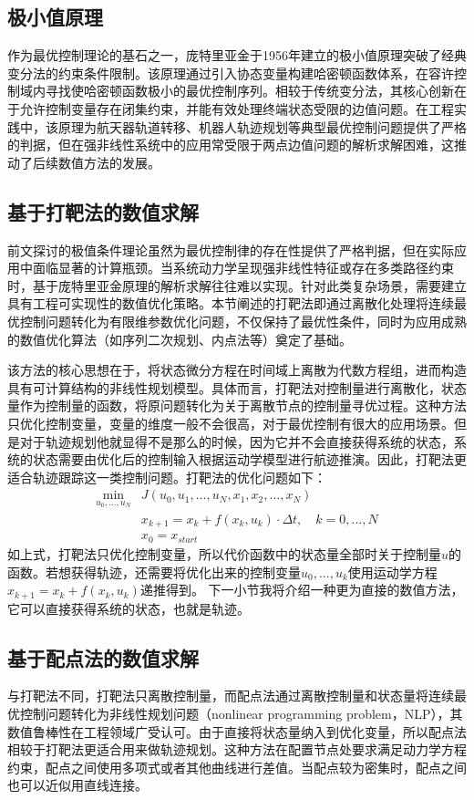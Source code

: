 \documentclass[master,academic]{ysuthesis} %
\begin{document}
	\subsection{极小值原理}
	作为最优控制理论的基石之一，庞特里亚金于1956年建立的极小值原理突破了经典变分法的约束条件限制。该原理通过引入协态变量构建哈密顿函数体系，在容许控制域内寻找使哈密顿函数极小的最优控制序列。相较于传统变分法，其核心创新在于允许控制变量存在闭集约束，并能有效处理终端状态受限的边值问题。在工程实践中，该原理为航天器轨道转移、机器人轨迹规划等典型最优控制问题提供了严格的判据，但在强非线性系统中的应用常受限于两点边值问题的解析求解困难，这推动了后续数值方法的发展。
	
	\subsection{基于打靶法的数值求解}
	前文探讨的极值条件理论虽然为最优控制律的存在性提供了严格判据，但在实际应用中面临显著的计算瓶颈。当系统动力学呈现强非线性特征或存在多类路径约束时，基于庞特里亚金原理的解析求解往往难以实现。针对此类复杂场景，需要建立具有工程可实现性的数值优化策略。本节阐述的打靶法即通过离散化处理将连续最优控制问题转化为有限维参数优化问题，不仅保持了最优性条件，同时为应用成熟的数值优化算法（如序列二次规划、内点法等）奠定了基础。

	该方法的核心思想在于，将状态微分方程在时间域上离散为代数方程组，进而构造具有可计算结构的非线性规划模型。具体而言，打靶法对控制量进行离散化，状态量作为控制量的函数，将原问题转化为关于离散节点的控制量寻优过程。这种方法只优化控制变量，变量的维度一般不会很高，对于最优控制有很大的应用场景。但是对于轨迹规划他就显得不是那么的时候，因为它并不会直接获得系统的状态，系统的状态需要由优化后的控制输入根据运动学模型进行航迹推演。因此，打靶法更适合轨迹跟踪这一类控制问题。打靶法的优化问题如下：
	\begin{equation}
	\begin{aligned}
		\min_{u_0,...,u_N} & J(u_0,u_1,\ldots,u_N,x_1,x_2,\ldots,x_N) \\
		& x_{k+1}=x_k+f(x_k,u_k)\cdot \Delta t,\quad k=0,\ldots,N \\
		& x_{0}=x_{start}
	\end{aligned}
	\end{equation}
	如上式，打靶法只优化控制变量，所以代价函数中的状态量全部时关于控制量$u$的函数。若想获得轨迹，还需要将优化出来的控制变量$u_0,...,u_k$使用运动学方程$x_{k+1}=x_k+f(x_k,u_k)$递推得到。
	下一小节我将介绍一种更为直接的数值方法，它可以直接获得系统的状态，也就是轨迹。
	
	\subsection{基于配点法的数值求解}
	与打靶法不同，打靶法只离散控制量，而配点法通过离散控制量和状态量将连续最优控制问题转化为非线性规划问题（nonlinear programming problem，NLP），其数值鲁棒性在工程领域广受认可。由于直接将状态量纳入到优化变量，所以配点法相较于打靶法更适合用来做轨迹规划。这种方法在配置节点处要求满足动力学方程约束，配点之间使用多项式或者其他曲线进行差值。当配点较为密集时，配点之间也可以近似用直线连接。
\end{document}
